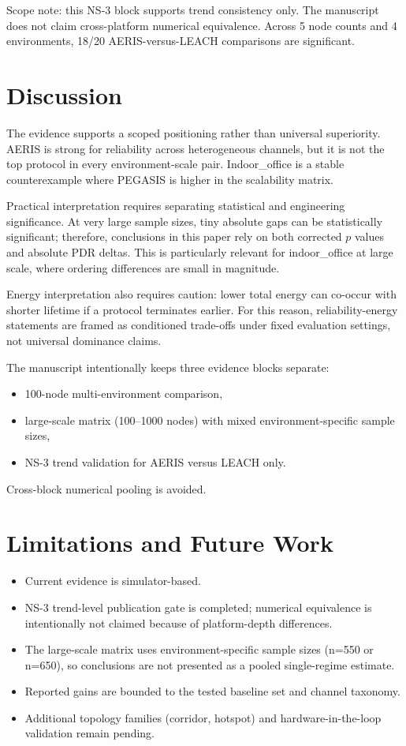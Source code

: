 ﻿\documentclass[sensors,article,submit,moreauthors,pdftex]{Definitions/mdpi}
\begin{document}
Scope note: this NS-3 block supports trend consistency only. The manuscript does not claim cross-platform numerical equivalence. Across 5 node counts and 4 environments, 18/20 AERIS-versus-LEACH comparisons are significant.

\section{Discussion}
The evidence supports a scoped positioning rather than universal superiority. AERIS is strong for reliability across heterogeneous channels, but it is not the top protocol in every environment-scale pair. Indoor\_office is a stable counterexample where PEGASIS is higher in the scalability matrix.

Practical interpretation requires separating statistical and engineering significance. At very large sample sizes, tiny absolute gaps can be statistically significant; therefore, conclusions in this paper rely on both corrected $p$ values and absolute PDR deltas. This is particularly relevant for indoor\_office at large scale, where ordering differences are small in magnitude.

Energy interpretation also requires caution: lower total energy can co-occur with shorter lifetime if a protocol terminates earlier. For this reason, reliability-energy statements are framed as conditioned trade-offs under fixed evaluation settings, not universal dominance claims.

The manuscript intentionally keeps three evidence blocks separate:
\begin{itemize}
\item 100-node multi-environment comparison,
\item large-scale matrix (100--1000 nodes) with mixed environment-specific sample sizes,
\item NS-3 trend validation for AERIS versus LEACH only.
\end{itemize}
Cross-block numerical pooling is avoided.

\section{Limitations and Future Work}
\begin{itemize}
\item Current evidence is simulator-based.
\item NS-3 trend-level publication gate is completed; numerical equivalence is intentionally not claimed because of platform-depth differences.
\item The large-scale matrix uses environment-specific sample sizes (n=550 or n=650), so conclusions are not presented as a pooled single-regime estimate.
\item Reported gains are bounded to the tested baseline set and channel taxonomy.
\item Additional topology families (corridor, hotspot) and hardware-in-the-loop validation remain pending.
\end{itemize}
\end{document}
